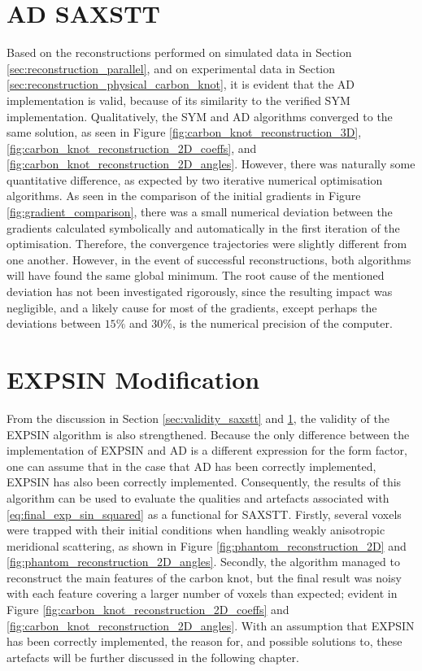 


\section{AD SAXSTT}\label{sec:ad_validation}
Based on the reconstructions performed on simulated data in Section \ref{sec:reconstruction_parallel},
and on experimental data in Section \ref{sec:reconstruction_physical_carbon_knot},
it is evident that the AD implementation is valid, because of its similarity to the verified SYM implementation.
Qualitatively, the SYM and AD algorithms converged to the same solution, as seen in Figure \ref{fig:carbon_knot_reconstruction_3D}, \ref{fig:carbon_knot_reconstruction_2D_coeffs}, and \ref{fig:carbon_knot_reconstruction_2D_angles}.
However, there was naturally some quantitative difference, as expected by two iterative numerical optimisation algorithms.
As seen in the comparison of the initial gradients in Figure \ref{fig:gradient_comparison},
there was a small numerical deviation between the gradients calculated symbolically and automatically in the first iteration of the optimisation.
Therefore, the convergence trajectories were slightly different from one another. However, in the event of successful reconstructions,
both algorithms will have found the same global minimum.
The root cause of the mentioned deviation has not been investigated rigorously, since the resulting impact was negligible,
and a likely cause for most of the gradients, except perhaps the deviations between $15\%$ and $30\%$, is the numerical precision of the computer.


\section{EXPSIN Modification}\label{sec:saxstt_validation}
From the discussion in Section \ref{sec:validity_saxstt} and \ref{sec:ad_validation}, the validity of the EXPSIN algorithm is also strengthened.
Because the only difference between the implementation of EXPSIN and AD is a different expression for the form factor,
one can assume that in the case that AD has been correctly implemented, EXPSIN has also been correctly implemented.
Consequently, the results of this algorithm can be used to evaluate the qualities and artefacts associated with \eqref{eq:final_exp_sin_squared} as a functional for SAXSTT.
Firstly, several voxels were trapped with their initial conditions when handling weakly anisotropic meridional scattering, as shown in Figure \ref{fig:phantom_reconstruction_2D} and \ref{fig:phantom_reconstruction_2D_angles}.
Secondly, the algorithm managed to reconstruct the main features of the carbon knot, but the final result was noisy with each feature covering a larger number of voxels than expected; evident in Figure \ref{fig:carbon_knot_reconstruction_2D_coeffs} and \ref{fig:carbon_knot_reconstruction_2D_angles}.
With an assumption that EXPSIN has been correctly implemented, the reason for, and possible solutions to, these artefacts will be further discussed in the following chapter.

